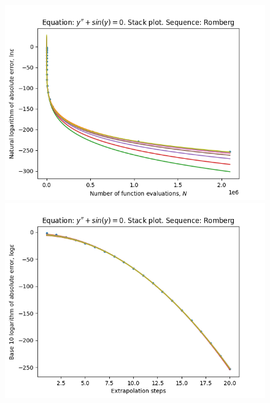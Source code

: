 \begin{figure}[H]
\centering
\begin{minipage}{0.45\textwidth}
\centering
\includegraphics[scale=0.45]{../results/emr_plots/oscillation_hp_romberg_stack.png}
\end{minipage}
\begin{minipage}{0.45\textwidth}
\centering
\includegraphics[scale=0.45]{../results/emr_plots/oscillation_hp_romberg_steps_stack.png}
\end{minipage}
\end{figure}


